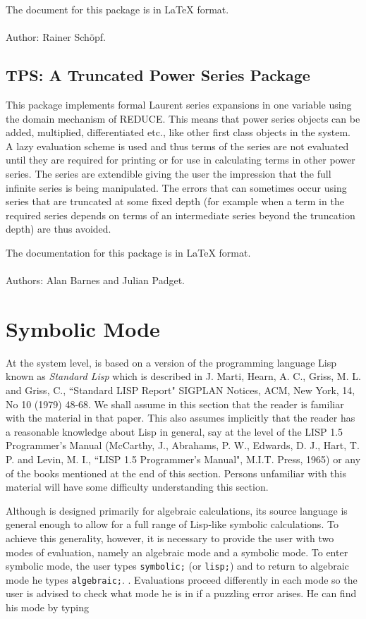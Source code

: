 The document for this package is in {\LaTeX} format.
\\ \\
Author: Rainer Sch\"opf.

\section{TPS: A Truncated Power Series Package}  

This package implements formal Laurent series expansions in one variable
using the domain mechanism of REDUCE.  This means that power series
objects can be added, multiplied, differentiated etc.,  like other first
class objects in the system.  A lazy evaluation scheme is used and thus
terms of the series are not evaluated until they are required for printing
or for use in calculating terms in other power series.  The series are
extendible giving the user the impression that the full infinite series is
being manipulated.  The errors that can sometimes occur using series that
are truncated at some fixed depth (for example when a term in the required
series depends on terms of an intermediate series beyond the truncation
depth) are thus avoided.

The documentation for this package is in {\LaTeX} format.
\\ \\
Authors:  Alan Barnes and Julian Padget.

\chapter{Symbolic Mode} 

At the system level, {\REDUCE} is based on a version of the programming
language Lisp  known as {\em Standard Lisp} which is described
in J.  Marti, Hearn, A. C., Griss, M. L. and Griss, C., ``Standard LISP
Report" SIGPLAN Notices, ACM, New York, 14, No 10 (1979) 48-68.  We shall
assume in this section that the reader is familiar with the material in
that paper.  This also assumes implicitly that the reader has a reasonable
knowledge about Lisp in general, say at the level of the LISP 1.5
Programmer's Manual (McCarthy, J., Abrahams, P. W., Edwards, D. J., Hart,
T. P. and Levin, M. I., ``LISP 1.5 Programmer's Manual", M.I.T.  Press,
1965) or any of the books mentioned at the end of this section.  Persons
unfamiliar with this material will have some difficulty understanding this
section.

Although {\REDUCE} is designed primarily for algebraic calculations, its
source language is general enough to allow for a full range of Lisp-like
symbolic calculations.  To achieve this generality, however, it is
necessary to provide the user with two modes of evaluation, namely an
algebraic mode  and a symbolic mode.  To enter symbolic mode, the user types {\tt symbolic;}
 (or {\tt lisp;})  and to return to
algebraic mode he types {\tt algebraic;}. .
Evaluations proceed differently in each mode so the user is advised to
check what mode he is in if a puzzling error arises.  He can find his mode
by typing 

